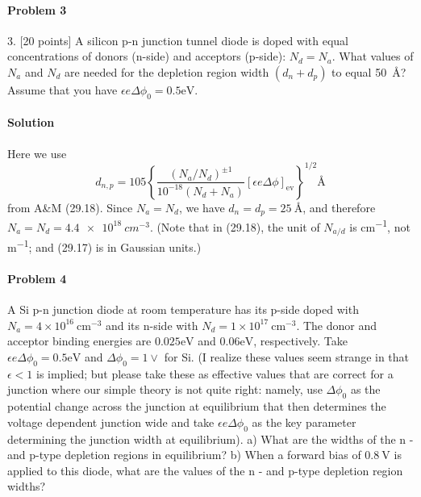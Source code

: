 \documentclass[hyperref, a4paper]{article}
\begin{document}
\paragraph{Problem 3} 3. [20 points] A silicon p-n junction tunnel diode is doped with equal concentrations of donors (n-side) and acceptors (p-side): $N_d=N_a$. What values of $N_a$ and $N_d$ are needed for the depletion region width $\left(d_n+d_p\right)$ to equal \SI{50}{\angstrom}? Assume that you have $\epsilon e \Delta \phi_0=0.5 \mathrm{eV}$.

\paragraph{Solution} Here we use 
\begin{equation}
    d_{n, p}=105\left\{\frac{\left(N_a / N_d\right)^{\pm 1}}{10^{-18}\left(N_d+N_a\right)}[\epsilon e \Delta \phi]_\text{ev}\right\}^{1 / 2} \unit{\angstrom}
\end{equation}
from A\&M (29.18).
Since $N_a = N_d$, we have $d_n = d_p = \SI{25}{\angstrom}$,
and therefore $N_a = N_d = \SI{4.4e18}{cm^{-3}}$.
(Note that in (29.18), the unit of $N_{a/d}$ is \unit{cm^{-1}}, not \unit{m^{-1}};
and (29.17) is in Gaussian units.)

\paragraph{Problem 4} A Si p-n junction diode at room temperature has its p-side doped with $N_a=4 \times 10^{16} \mathrm{~cm}^{-3}$ and its $\mathrm{n}$-side with $N_d=1 \times 10^{17} \mathrm{~cm}^{-3}$. The donor and acceptor binding energies are $0.025 \mathrm{eV}$ and $0.06 \mathrm{eV}$, respectively. Take $\epsilon e \Delta \phi_0=0.5 \mathrm{eV}$ and $\Delta \phi_0=1 \vee$ for Si. (I realize these values seem strange in that $\epsilon<1$ is implied;
but please take these as effective values that are correct for a junction where our simple theory is not quite right: namely, use $\Delta \phi_0$ as the potential change across the junction at equilibrium that then determines the voltage dependent junction wide and take $\epsilon e \Delta \phi_0$ as the key parameter determining the junction width at equilibrium).
a) What are the widths of the $\mathrm{n}$ - and $\mathrm{p}$-type depletion regions in equilibrium?
b) When a forward bias of $0.8 \mathrm{~V}$ is applied to this diode, what are the values of the $\mathrm{n}$ - and $\mathrm{p}$-type depletion region widths?
\end{document}

